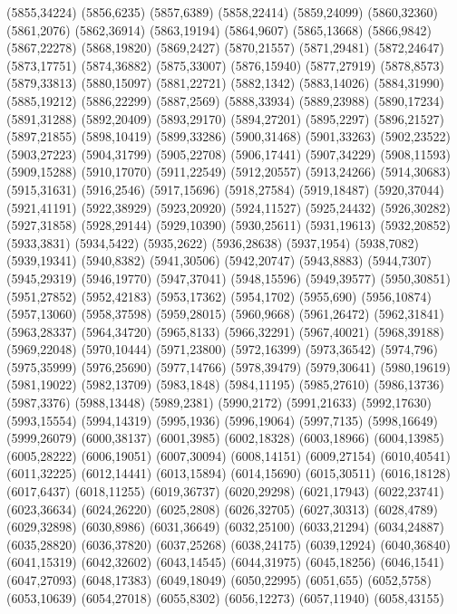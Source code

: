 (5855,34224)
(5856,6235)
(5857,6389)
(5858,22414)
(5859,24099)
(5860,32360)
(5861,2076)
(5862,36914)
(5863,19194)
(5864,9607)
(5865,13668)
(5866,9842)
(5867,22278)
(5868,19820)
(5869,2427)
(5870,21557)
(5871,29481)
(5872,24647)
(5873,17751)
(5874,36882)
(5875,33007)
(5876,15940)
(5877,27919)
(5878,8573)
(5879,33813)
(5880,15097)
(5881,22721)
(5882,1342)
(5883,14026)
(5884,31990)
(5885,19212)
(5886,22299)
(5887,2569)
(5888,33934)
(5889,23988)
(5890,17234)
(5891,31288)
(5892,20409)
(5893,29170)
(5894,27201)
(5895,2297)
(5896,21527)
(5897,21855)
(5898,10419)
(5899,33286)
(5900,31468)
(5901,33263)
(5902,23522)
(5903,27223)
(5904,31799)
(5905,22708)
(5906,17441)
(5907,34229)
(5908,11593)
(5909,15288)
(5910,17070)
(5911,22549)
(5912,20557)
(5913,24266)
(5914,30683)
(5915,31631)
(5916,2546)
(5917,15696)
(5918,27584)
(5919,18487)
(5920,37044)
(5921,41191)
(5922,38929)
(5923,20920)
(5924,11527)
(5925,24432)
(5926,30282)
(5927,31858)
(5928,29144)
(5929,10390)
(5930,25611)
(5931,19613)
(5932,20852)
(5933,3831)
(5934,5422)
(5935,2622)
(5936,28638)
(5937,1954)
(5938,7082)
(5939,19341)
(5940,8382)
(5941,30506)
(5942,20747)
(5943,8883)
(5944,7307)
(5945,29319)
(5946,19770)
(5947,37041)
(5948,15596)
(5949,39577)
(5950,30851)
(5951,27852)
(5952,42183)
(5953,17362)
(5954,1702)
(5955,690)
(5956,10874)
(5957,13060)
(5958,37598)
(5959,28015)
(5960,9668)
(5961,26472)
(5962,31841)
(5963,28337)
(5964,34720)
(5965,8133)
(5966,32291)
(5967,40021)
(5968,39188)
(5969,22048)
(5970,10444)
(5971,23800)
(5972,16399)
(5973,36542)
(5974,796)
(5975,35999)
(5976,25690)
(5977,14766)
(5978,39479)
(5979,30641)
(5980,19619)
(5981,19022)
(5982,13709)
(5983,1848)
(5984,11195)
(5985,27610)
(5986,13736)
(5987,3376)
(5988,13448)
(5989,2381)
(5990,2172)
(5991,21633)
(5992,17630)
(5993,15554)
(5994,14319)
(5995,1936)
(5996,19064)
(5997,7135)
(5998,16649)
(5999,26079)
(6000,38137)
(6001,3985)
(6002,18328)
(6003,18966)
(6004,13985)
(6005,28222)
(6006,19051)
(6007,30094)
(6008,14151)
(6009,27154)
(6010,40541)
(6011,32225)
(6012,14441)
(6013,15894)
(6014,15690)
(6015,30511)
(6016,18128)
(6017,6437)
(6018,11255)
(6019,36737)
(6020,29298)
(6021,17943)
(6022,23741)
(6023,36634)
(6024,26220)
(6025,2808)
(6026,32705)
(6027,30313)
(6028,4789)
(6029,32898)
(6030,8986)
(6031,36649)
(6032,25100)
(6033,21294)
(6034,24887)
(6035,28820)
(6036,37820)
(6037,25268)
(6038,24175)
(6039,12924)
(6040,36840)
(6041,15319)
(6042,32602)
(6043,14545)
(6044,31975)
(6045,18256)
(6046,1541)
(6047,27093)
(6048,17383)
(6049,18049)
(6050,22995)
(6051,655)
(6052,5758)
(6053,10639)
(6054,27018)
(6055,8302)
(6056,12273)
(6057,11940)
(6058,43155)
